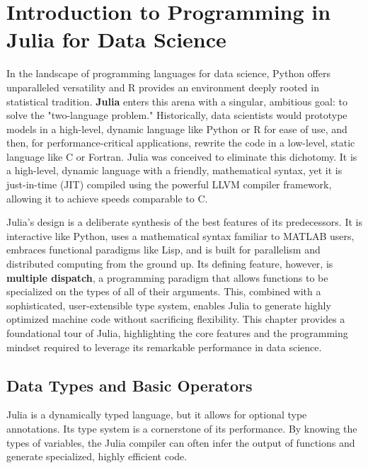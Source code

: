 \cleardoublepage
{}

\chapter*{Introduction to Programming in Julia for Data Science}
\label{chap:julia_intro}

In the landscape of programming languages for data science, Python offers unparalleled versatility and R provides an environment deeply rooted in statistical tradition. \textbf{Julia} enters this arena with a singular, ambitious goal: to solve the "two-language problem." Historically, data scientists would prototype models in a high-level, dynamic language like Python or R for ease of use, and then, for performance-critical applications, rewrite the code in a low-level, static language like C or Fortran. Julia was conceived to eliminate this dichotomy. It is a high-level, dynamic language with a friendly, mathematical syntax, yet it is just-in-time (JIT) compiled using the powerful LLVM compiler framework, allowing it to achieve speeds comparable to C.

Julia's design is a deliberate synthesis of the best features of its predecessors. It is interactive like Python, uses a mathematical syntax familiar to MATLAB users, embraces functional paradigms like Lisp, and is built for parallelism and distributed computing from the ground up. Its defining feature, however, is \textbf{multiple dispatch}, a programming paradigm that allows functions to be specialized on the types of all of their arguments. This, combined with a sophisticated, user-extensible type system, enables Julia to generate highly optimized machine code without sacrificing flexibility. This chapter provides a foundational tour of Julia, highlighting the core features and the programming mindset required to leverage its remarkable performance in data science.

\section{Data Types and Basic Operators}
\label{sec:julia_data_types}
Julia is a dynamically typed language, but it allows for optional type annotations. Its type system is a cornerstone of its performance. By knowing the types of variables, the Julia compiler can often infer the output of functions and generate specialized, highly efficient code.

